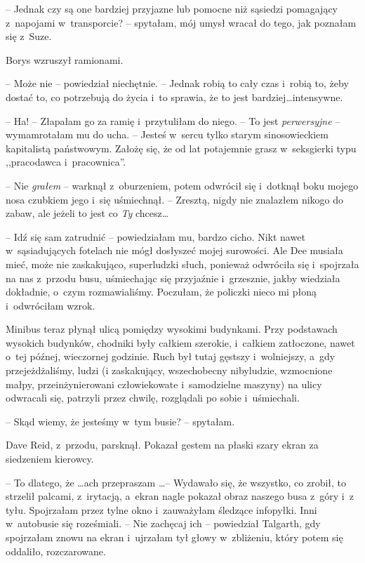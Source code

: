 \documentclass[oneside,polish,11pt,sfheadings]{mwbk}
\begin{document}
-- Jednak czy są one bardziej przyjazne lub pomocne niż sąsiedzi
pomagający z~napojami w~transporcie? -- spytałam, mój umysł wracał do
tego, jak poznałam się z~Suze.

Borys wzruszył ramionami. 

-- Może nie -- powiedział niechętnie. -- Jednak
robią to cały czas i~robią to, żeby dostać to, co potrzebują do życia i~to sprawia, że to jest bardziej\ldots  intensywne.

-- Ha! -- Złapałam go za ramię i~przytuliłam do niego. -- To jest
\textit{perwersyjne} -- wymamrotałam mu do ucha. -- Jesteś w~sercu tylko
starym sinosowieckiem kapitalistą państwowym. Założę się, że od lat
potajemnie grasz w~seksgierki typu ,,pracodawca i~pracownica''.

-- Nie \textit{grałem} -- warknął z~oburzeniem, potem odwrócił się i~dotknął
boku mojego nosa czubkiem jego i~się uśmiechnął. -- Zresztą, nigdy nie
znalazłem nikogo do zabaw, ale jeżeli to jest co \textit{Ty} chcesz\ldots 

-- Idź się sam zatrudnić -- powiedziałam mu, bardzo cicho. Nikt nawet w~sąsiadujących fotelach nie mógł dosłyszeć mojej surowości. Ale Dee
musiała mieć, może nie zaskakująco, superludzki słuch, ponieważ
odwróciła się i~spojrzała na nas z~przodu busu, uśmiechając się
przyjaźnie i~grzesznie, jakby wiedziała dokładnie, o~czym rozmawialiśmy.
Poczułam, że policzki nieco mi płoną i~odwróciłam wzrok.

Minibus teraz płynął ulicą pomiędzy wysokimi budynkami. Przy podstawach
wysokich budynków, chodniki były całkiem szerokie, i~całkiem zatłoczone,
nawet o~tej późnej, wieczornej godzinie. Ruch był tutaj gęstszy i~wolniejszy, a~gdy przejeżdżaliśmy, ludzi (i zaskakujący, wszechobecny
nibyludzie, wzmocnione małpy, przeinżynierowani człowiekowate i~samodzielne maszyny) na ulicy odwracali się, patrzyli przez chwilę,
rozglądali po sobie i~uśmiechali.

-- Skąd wiemy, że jesteśmy w~tym busie? -- spytałam.

Dave Reid, z~przodu, parsknął. Pokazał gestem na płaski szary ekran za
siedzeniem kierowcy. 

-- To dlatego, że \ldots  ach przepraszam \ldots  -- Wydawało
się, że wszystko, co zrobił, to strzelił palcami, z~irytacją, a~ekran
nagle pokazał obraz naszego busa z~góry i~z tyłu. Spojrzałam przez tylne
okno i~zauważyłam śledzące infopyłki. Inni w~autobusie się roześmiali. -- Nie zachęcaj ich -- powiedział Talgarth, gdy spojrzałam znowu na ekran i~ujrzałam tył głowy w~zbliżeniu, który potem się oddaliło, rozczarowane.
\end{document}

